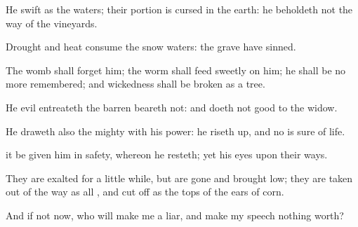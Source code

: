 {\par }{\PP {}He
{}
swift as the
waters; their
portion is
cursed in the
earth: he
beholdeth not the
way of the
vineyards.

Drought and
heat
consume the
snow
waters:
{} the
grave
{} have
sinned.

The
womb shall
forget him; the
worm shall feed
sweetly on him; he shall be no more
remembered; and
wickedness shall be
broken as a
tree.

He evil
entreateth the
barren
{}
beareth not: and doeth not
good to the
widow.

He
draweth also the
mighty with his
power: he riseth
up, and no
{} is
sure of
life.

 it be
given him
{} in
safety, whereon he
resteth; yet his
eyes
{} upon their
ways.

They are
exalted for a little
while, but are gone and brought
low; they are taken
out of the
way as all
{}, and cut
off as the
tops of the ears of
corn.

And if
{} not
{}
now, who will
make me a
liar, and
make my
speech nothing
worth?




\par }
